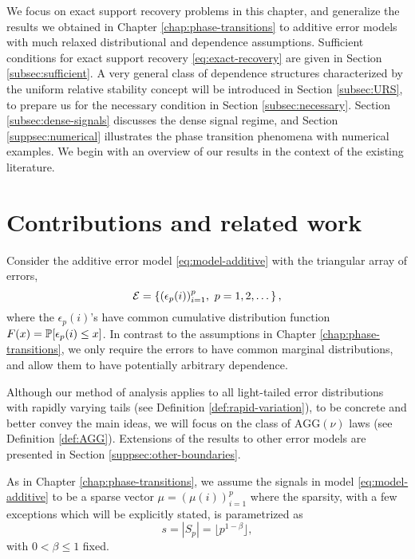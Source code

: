 
We focus on exact support recovery problems in this chapter, and generalize the results we obtained in Chapter \ref{chap:phase-transitions} to additive error models with much relaxed distributional and dependence assumptions.  
Sufficient conditions for exact support recovery \eqref{eq:exact-recovery} are given in 
Section \ref{subsec:sufficient}.  A very general class of dependence structures characterized by the uniform relative stability concept will 
be introduced in Section \ref{subsec:URS}, to prepare us for the necessary condition in Section \ref{subsec:necessary}.
Section \ref{subsec:dense-signals} discusses the dense signal regime, and Section \ref{suppsec:numerical} illustrates the phase transition 
phenomena with numerical examples.  We begin with an overview of our results in the context of the existing literature.




\section{Contributions and related work} Consider the additive error model \eqref{eq:model-additive} with the triangular array of errors,
\begin{equation} \label{eq:error-array}
    {\cal E} = \left\{ (\epsilon_p(i))_{i=1}^p,\ p=1,2,\dots\right\},
\end{equation}
where the $\epsilon_p(i)$'s have common cumulative distribution function $F(x)=\P[\epsilon_p(i)\le x]$.
In contrast to the assumptions in Chapter \ref{chap:phase-transitions}, we only require the errors to have common marginal distributions, and allow them to have potentially arbitrary dependence.
 

Although our method of analysis applies to all light-tailed error distributions with rapidly varying tails (see Definition \ref{def:rapid-variation}), to be concrete and better convey the main ideas, we will focus on the class of $\mathrm{AGG}(\nu)$ laws (see Definition \ref{def:AGG}).
Extensions of the results to other error models are presented in Section \ref{suppsec:other-boundaries}.

As in Chapter \ref{chap:phase-transitions}, we assume the signals in model \eqref{eq:model-additive} to be a sparse vector $\mu = \left(\mu(i)\right)_{i=1}^p$ where the sparsity, with a few exceptions which will be explicitly stated, is parametrized as
\begin{equation} \label{eq:sparsity-parametrized}
    s = |S_p| = \lfloor p^{1 -\beta} \rfloor, %
\end{equation}
with $0 < \beta \le 1$ fixed.

